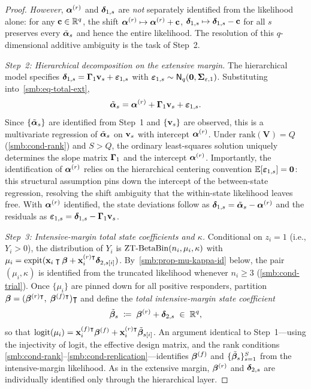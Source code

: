\begin{proof}
  \emph{However}, $\boldsymbol{\alpha}^{(r)}$ and $\boldsymbol{\delta}_{1,s}$ are
  \emph{not} separately identified from the likelihood alone:
  for any $\mathbf{c} \in \mathbb{R}^q$, the shift
  $\boldsymbol{\alpha}^{(r)} \mapsto \boldsymbol{\alpha}^{(r)} + \mathbf{c}$,\;
  $\boldsymbol{\delta}_{1,s} \mapsto \boldsymbol{\delta}_{1,s} - \mathbf{c}$ for all $s$
  preserves every $\tilde{\boldsymbol{\alpha}}_s$ and hence the entire likelihood.
  The resolution of this $q$-dimensional additive ambiguity is
  the task of Step~2.

  \medskip\noindent\textit{Step~2: Hierarchical decomposition on the
  extensive margin.}\enspace
  The hierarchical model specifies
  $\boldsymbol{\delta}_{1,s} = \boldsymbol{\Gamma}_1\mathbf{v}_s + \boldsymbol{\varepsilon}_{1,s}$ with
  $\boldsymbol{\varepsilon}_{1,s} \sim \textsf{N}_q(\mathbf{0},
  \boldsymbol{\Sigma}_{\varepsilon,1})$.
  Substituting into~\eqref{smb:eq-total-ext},
  \[
    \tilde{\boldsymbol{\alpha}}_s
    = \boldsymbol{\alpha}^{(r)} + \boldsymbol{\Gamma}_1\mathbf{v}_s + \boldsymbol{\varepsilon}_{1,s}.
  \]
  Since $\{\tilde{\boldsymbol{\alpha}}_s\}$ are identified from Step~1 and
  $\{\mathbf{v}_s\}$ are observed, this is a multivariate regression of
  $\tilde{\boldsymbol{\alpha}}_s$ on $\mathbf{v}_s$ with intercept $\boldsymbol{\alpha}^{(r)}$.
  Under $\mathrm{rank}(\mathbf{V}) = Q$ (\ref{smb:cond-rank}) and $S > Q$,
  the ordinary least-squares solution uniquely determines the
  slope matrix $\boldsymbol{\Gamma}_1$ and the intercept $\boldsymbol{\alpha}^{(r)}$.
  Importantly, the identification of $\boldsymbol{\alpha}^{(r)}$ relies on the
  hierarchical centering convention $\mathbb{E}[\boldsymbol{\varepsilon}_{1,s}] = \mathbf{0}$:
  this structural assumption pins down the intercept of the
  between-state regression, resolving the shift ambiguity that the
  within-state likelihood leaves free.
  With $\boldsymbol{\alpha}^{(r)}$ identified, the state deviations follow as
  $\boldsymbol{\delta}_{1,s} = \tilde{\boldsymbol{\alpha}}_s - \boldsymbol{\alpha}^{(r)}$ and the
  residuals as
  $\boldsymbol{\varepsilon}_{1,s} = \boldsymbol{\delta}_{1,s} - \boldsymbol{\Gamma}_1\mathbf{v}_s$.

  \medskip\noindent\textit{Step~3: Intensive-margin total state
  coefficients and $\kappa$.}\enspace
  Conditional on $z_i = 1$ (i.e., $Y_i > 0$), the distribution of
  $Y_i$ is $\operatorname{ZT\text{-}BetaBin}(n_i, \mu_i, \kappa)$ with
  $\mu_i = \operatorname{expit}(\mathbf{x}_i\intercal\boldsymbol{\beta} +
  \mathbf{x}_i^{(r)\intercal}\boldsymbol{\delta}_{2,s[i]})$.
  By~\cref{smb:prop-mu-kappa-id} below, the pair $(\mu_i, \kappa)$ is
  identified from the truncated likelihood whenever $n_i \ge 3$
  (\ref{smb:cond-trial}). Once $\{\mu_i\}$ are pinned down for
  all positive responders, partition
  $\boldsymbol{\beta} = (\boldsymbol{\beta}^{(r)\intercal},\;\boldsymbol{\beta}^{(f)\intercal})\intercal$ and define
  the \emph{total intensive-margin state coefficient}
  \begin{equation}\label{smb:eq-total-int}
    \tilde{\boldsymbol{\beta}}_s \;\coloneqq\; \boldsymbol{\beta}^{(r)} + \boldsymbol{\delta}_{2,s}
    \;\in\; \mathbb{R}^q,
  \end{equation}
  so that
  $\operatorname{logit}(\mu_i) = \mathbf{x}_i^{(f)\intercal}\boldsymbol{\beta}^{(f)}
    + \mathbf{x}_i^{(r)\intercal}\tilde{\boldsymbol{\beta}}_{s[i]}$.
  An argument identical to Step~1---using the injectivity of logit,
  the effective design matrix, and the rank conditions
  \ref{smb:cond-rank}--\ref{smb:cond-replication}---identifies
  $\boldsymbol{\beta}^{(f)}$ and $\{\tilde{\boldsymbol{\beta}}_s\}_{s=1}^S$ from the
  intensive-margin likelihood. As in the extensive margin,
  $\boldsymbol{\beta}^{(r)}$ and $\boldsymbol{\delta}_{2,s}$ are individually identified
  only through the hierarchical layer.


\end{proof}
